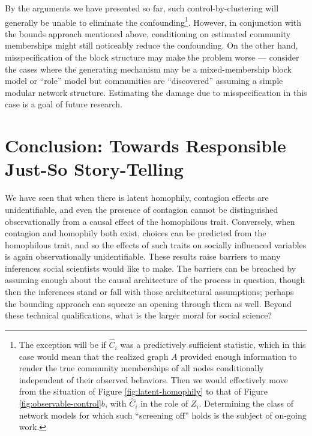 \documentclass{article}
\begin{document}
\begin{multicols}{2}
By the arguments we have presented so far, such control-by-clustering will
generally be unable to eliminate the confounding\footnote{The exception will be
  if $\hat{C}_i$ was a predictively sufficient statistic, which in this case
  would mean that the realized graph $A$ provided enough information to render
  the true community memberships of all nodes conditionally independent of
  their observed behaviors.  Then we would effectively move from the situation
  of Figure \ref{fig:latent-homophily} to that of Figure
  \ref{fig:observable-control}$b$, with $\hat{C}_i$ in the role of $Z_i$.
  Determining the class of network models for which such ``screening off''
  holds is the subject of on-going work.}.  However, in conjunction with the
bounds approach mentioned above, conditioning on estimated community
memberships might still noticeably reduce the confounding.  On the other hand,
misspecification of the block structure may make the problem worse --- consider
the cases where the generating mechanism may be a mixed-membership block model
\citep{airoldi2008mmsb} or ``role'' model \citep{Reichardt-White-role-models}
but communities are ``discovered'' assuming a simple modular network
structure. Estimating the damage due to misspecification in this case is a goal
of future research.

\section{Conclusion: Towards Responsible Just-So Story-Telling}
\label{sec:conclusion}

We have seen that when there is latent homophily, contagion effects are
unidentifiable, and even the presence of contagion cannot be distinguished
observationally from a causal effect of the homophilous trait.  Conversely,
when contagion and homophily both exist, choices can be predicted from the
homophilous trait, and so the effects of such traits on socially influenced
variables is again observationally unidentifiable.  These results raise
barriers to many inferences social scientists would like to make.  The barriers
can be breached by assuming enough about the causal architecture of the process
in question, though then the inferences stand or fall with those architectural
assumptions; perhaps the bounding approach can squeeze an opening through them
as well.  Beyond these technical qualifications, what is the larger moral for
social science?


\end{multicols}
\end{document}
